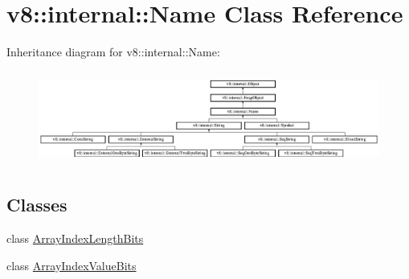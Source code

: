 \hypertarget{classv8_1_1internal_1_1_name}{}\section{v8\+:\+:internal\+:\+:Name Class Reference}
\label{classv8_1_1internal_1_1_name}
Inheritance diagram for v8\+:\+:internal\+:\+:Name\+:\begin{figure}[H]
\begin{center}
\leavevmode
\includegraphics[height=3.111111cm]{classv8_1_1internal_1_1_name}
\end{center}
\end{figure}
\subsection*{Classes}
\begin{DoxyCompactItemize}
\item 
class \hyperlink{classv8_1_1internal_1_1_name_1_1_array_index_length_bits}{Array\+Index\+Length\+Bits}
\item 
class \hyperlink{classv8_1_1internal_1_1_name_1_1_array_index_value_bits}{Array\+Index\+Value\+Bits}
\end{DoxyCompactItemize}
